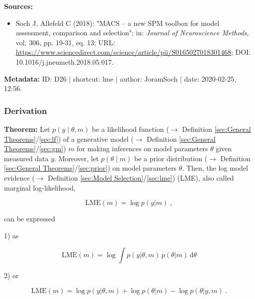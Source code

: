 \documentclass[a4paper,12pt]{book}
\begin{document}
\vspace{1em}
\textbf{Sources:}
\begin{itemize}
\item Soch J, Allefeld C (2018): "MACS – a new SPM toolbox for model assessment, comparison and selection"; in: \textit{Journal of Neuroscience Methods}, vol. 306, pp. 19-31, eq. 13; URL: \url{https://www.sciencedirect.com/science/article/pii/S0165027018301468}; DOI: 10.1016/j.jneumeth.2018.05.017.
\end{itemize}


\vspace{1em}
\textbf{Metadata:} ID: D26 | shortcut: lme | author: JoramSoch | date: 2020-02-25, 12:56.


\subsubsection[\textbf{Derivation}]{Derivation} \label{sec:lme-der}

\vspace{1em}
\textbf{Theorem:} Let $p(y \mid \theta,m)$ be a likelihood function ($\rightarrow$ Definition \ref{sec:General Theorems}/\ref{sec:lf}) of a generative model ($\rightarrow$ Definition \ref{sec:General Theorems}/\ref{sec:gm}) $m$ for making inferences on model parameters $\theta$ given measured data $y$. Moreover, let $p(\theta \mid m)$ be a prior distribution ($\rightarrow$ Definition \ref{sec:General Theorems}/\ref{sec:prior}) on model parameters $\theta$. Then, the log model evidence ($\rightarrow$ Definition \ref{sec:Model Selection}/\ref{sec:lme}) (LME), also called marginal log-likelihood,

\begin{equation} \label{eq:lme-der-LME-term}
\mathrm{LME}(m) = \log p(y|m) \; ,
\end{equation}

can be expressed

1) as

\begin{equation} \label{eq:lme-der-LME-marg}
\mathrm{LME}(m) = \log \int p(y|\theta,m) \, p(\theta|m) \, \mathrm{d}\theta
\end{equation}

2) or

\begin{equation} \label{eq:lme-der-LME-bayes}
\mathrm{LME}(m) = \log p(y|\theta,m) + \log p(\theta|m) - \log p(\theta|y,m) \; .
\end{equation}
\end{document}

